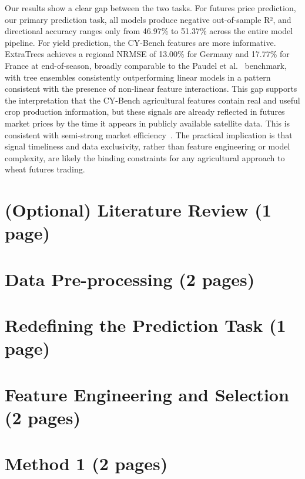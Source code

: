 \documentclass[pdflatex,sn-mathphys-num, oneside]{sn-jnl}%
\theoremstyle{thmstyleone}%
\theoremstyle{thmstyletwo}%
\theoremstyle{thmstylethree}%
\begin{document}
Our results show a clear gap between the two tasks. For futures price prediction, our primary prediction task, all models produce negative out-of-sample R², and directional accuracy ranges only from 46.97\% to 51.37\% across the entire model pipeline. For yield prediction, the CY-Bench features are more informative. ExtraTrees achieves a regional NRMSE of 13.00\% for Germany and 17.77\% for France at end-of-season, broadly comparable to the Paudel et al.~\cite{bib16} benchmark, with tree ensembles consistently outperforming linear models in a pattern consistent with the presence of non-linear feature interactions. This gap supports the interpretation that the CY-Bench agricultural features contain real and useful crop production information, but these signals are already reflected in futures market prices by the time it appears in publicly available satellite data. This is consistent with semi-strong market efficiency~\cite{bib30}. The practical implication is that signal timeliness and data exclusivity, rather than feature engineering or model complexity, are likely the binding constraints for any agricultural approach to wheat futures trading.

\clearpage

\section{(Optional) Literature Review (1 page)}\label{sec3}

\clearpage

\section{Data Pre-processing (2 pages)}\label{sec3}

\clearpage

\section{Redefining the Prediction Task (1 page)}\label{sec3}

\clearpage

\section{Feature Engineering and Selection (2 pages)}\label{sec3}

\clearpage

\section{Method 1 (2 pages)}\label{sec3}
\end{document}
